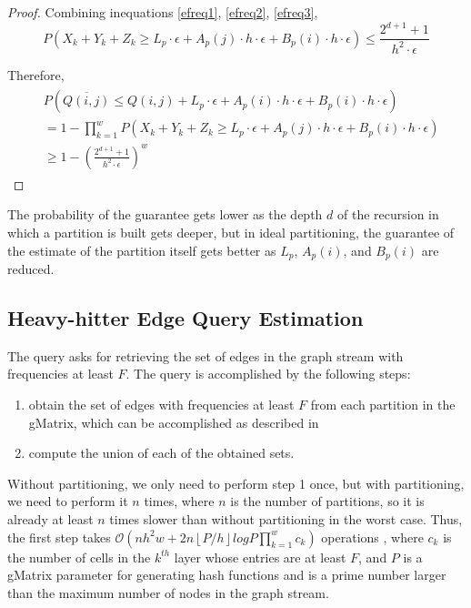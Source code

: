 \begin{proof}
Combining inequations \ref{efreq1}, \ref{efreq2}, \ref{efreq3},
\begin{equation} \label{efreq4}
  P(X_k + Y_k + Z_k \geq L_p \cdot \epsilon + A_p(j) \cdot h \cdot \epsilon + B_p(i) \cdot h \cdot \epsilon) \leq \frac{2^{d+1}+1}{h^2\cdot\epsilon}
\end{equation}

Therefore,
\begin{align}
\begin{split}
&  P(\overline{Q(i,j)} \leq Q(i,j) + L_p \cdot \epsilon + A_p(i) \cdot h \cdot \epsilon + B_p(i) \cdot h \cdot \epsilon)
\\  &= 1 - \prod _{k=1}^{w}P(X_k + Y_k + Z_k \geq L_p \cdot \epsilon + A_p(j) \cdot h \cdot \epsilon + B_p(i) \cdot h \cdot \epsilon)
\\  &\geq 1-(\frac{2^{d+1}+1}{h^2\cdot\epsilon})^w
\end{split}
\end{align}

\end{proof}

\begin{remarks}
  The probability of the guarantee gets lower as the depth $d$ of the recursion in which a partition is built gets deeper, but in ideal partitioning, the guarantee of the estimate of the partition itself gets better as $L_p$, $A_p(i)$, and $B_p(i)$ are reduced.
\end{remarks}


\subsection{Heavy-hitter Edge Query Estimation}
The query asks for retrieving the set of edges in the graph stream with frequencies at least $F$. The query is accomplished by the following steps:

\begin{enumerate}
\item obtain the set of edges with frequencies at least $F$ from each partition in the gMatrix, which can be accomplished as described in \cite{khan}
\item compute the union of each of the obtained sets.
\end{enumerate}

Without partitioning, we only need to perform step 1 once, but with partitioning, we need to perform it $n$ times, where $n$ is the number of partitions, so it is already at least $n$ times slower than without partitioning in the worst case. Thus, the first step takes $\mathcal{O}(nh^2w + 2 n \left \lfloor{P/h} \right \rfloor log P \prod_{k=1}^wc_k)$ operations \cite{khan}, where $c_k$ is the number of cells in the $k^{th}$ layer whose entries are at least $F$, and $P$ is a gMatrix parameter for generating hash functions and is a prime number larger than the maximum number of nodes in the graph stream.

